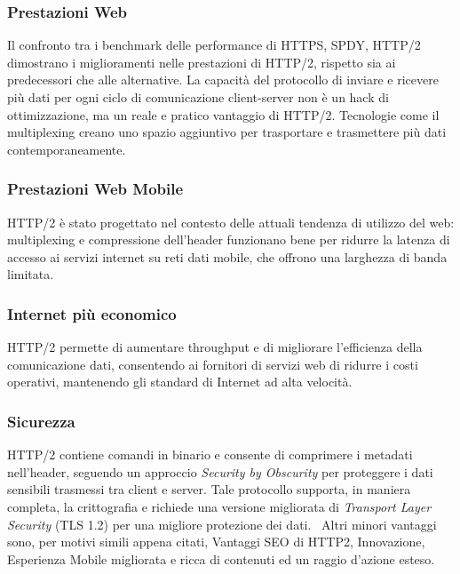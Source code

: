 \documentclass[a4paper,11pt]{article}
\begin{document}
\subsubsection{Prestazioni Web}
Il confronto tra i benchmark delle performance di HTTPS, SPDY, HTTP/2 dimostrano i miglioramenti nelle prestazioni di HTTP/2, rispetto sia ai predecessori che alle alternative.\newline
La capacità del protocollo di inviare e ricevere più dati per ogni ciclo di comunicazione client-server non è un hack di ottimizzazione, ma un reale e pratico vantaggio di HTTP/2.\newline
Tecnologie come il multiplexing creano uno spazio aggiuntivo per trasportare e trasmettere più dati contemporaneamente.
\subsubsection{Prestazioni Web Mobile}
HTTP/2 è stato progettato nel contesto delle attuali tendenza di utilizzo del web: multiplexing e compressione dell’header funzionano bene per ridurre la latenza di accesso ai servizi internet su reti dati mobile, che offrono una larghezza di banda limitata.
\subsubsection{Internet più economico}
HTTP/2 permette di aumentare throughput e di migliorare l’efficienza della comunicazione dati, consentendo ai fornitori di servizi web di ridurre i costi operativi, mantenendo gli standard di Internet ad alta velocità.
\subsubsection{Sicurezza}
HTTP/2 contiene comandi in binario e consente di comprimere i metadati nell’header, seguendo un approccio \textit{Security by Obscurity} per proteggere i dati sensibili trasmessi tra client e server.\newline
Tale protocollo supporta, in maniera completa, la crittografia e richiede una versione migliorata di \textit{Transport Layer Security} (TLS 1.2) per una migliore protezione dei dati.\bigbreak
\
Altri minori vantaggi sono, per motivi simili appena citati, Vantaggi SEO di HTTP2, Innovazione, Esperienza Mobile migliorata e ricca di contenuti ed un raggio d’azione esteso.
\end{document}

